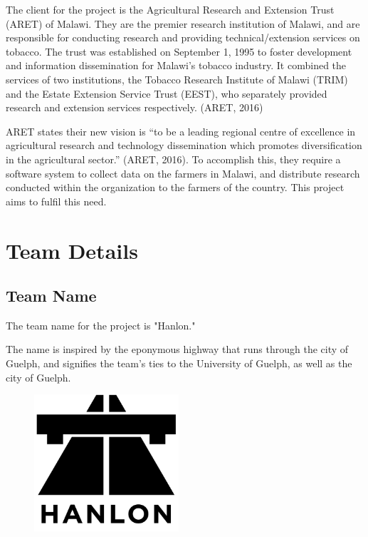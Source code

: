\documentclass[12pt,letterpaper]{article}
\begin{document}
The client for the project is the Agricultural Research and Extension Trust (ARET) of Malawi. They are the premier research institution of Malawi, and are responsible for conducting research and providing technical/extension services on tobacco. The trust was established on September 1, 1995 to foster development and information dissemination for Malawi's tobacco industry. It combined the services of two institutions, the Tobacco Research Institute of Malawi (TRIM) and the Estate Extension Service Trust (EEST), who separately provided research and extension services respectively. (ARET, 2016)

ARET states their new vision is “to be a leading regional centre of excellence in agricultural research and technology dissemination which promotes diversification in the agricultural sector.” (ARET, 2016). To accomplish this, they require a software system to collect data on the farmers in Malawi, and distribute research conducted within the organization to the farmers of the country. This project aims to fulfil this need.

\clearpage
\section{Team Details}
\subsection{Team Name}
The team name for the project is "Hanlon."\par
The name is inspired by the eponymous highway that runs through the city of Guelph, and signifies the team's ties to the University of Guelph, as well as the city of Guelph.\\

\begin{figure}[H]
	\centering	
	\includegraphics[height=2in]{img/hanlon-logo.png}
	\label{fig:kitten}
\end{figure}
\end{document}
